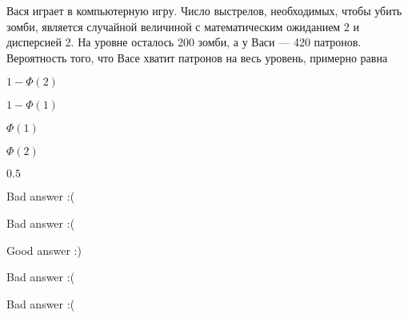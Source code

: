 
\begin{question}
Вася играет в компьютерную игру. Число выстрелов, необходимых, чтобы
убить зомби, является случайной величиной с математическим ожиданием 2 и
дисперсией 2. На уровне осталось 200 зомби, а у Васи --- 420 патронов.
Вероятность того, что Васе хватит патронов на весь уровень, примерно
равна
\begin{answerlist}
  \item \(1 - \Phi(2)\)
  \item \(1 - \Phi(1)\)
  \item \(\Phi(1)\)
  \item \(\Phi(2)\)
  \item \(0.5\)
\end{answerlist}
\end{question}

\begin{solution}
\begin{answerlist}
  \item Bad answer :(
  \item Bad answer :(
  \item Good answer :)
  \item Bad answer :(
  \item Bad answer :(
\end{answerlist}
\end{solution}

